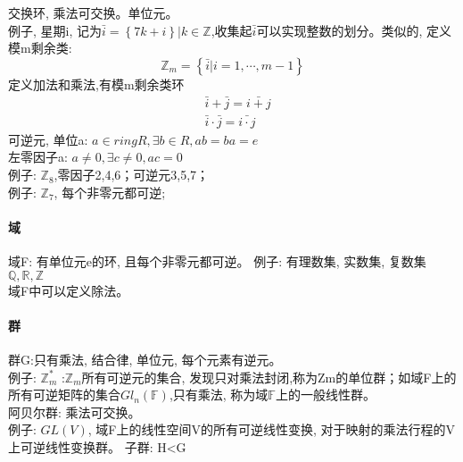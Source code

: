 \documentclass[UTF8]{../../09-Mathematics}
\begin{document}
交换环, 乘法可交换。单位元。\\
例子, 星期i, 记为$\bar i =\left\{ 7k+i \right\} |k\in \mathbb Z$,收集起$\bar i$可以实现整数的划分。类似的, 定义模m剩余类: 
\begin{equation}
    \mathbb Z_m =\left\{ \bar i | i=1, \cdots ,m-1 \right\}
\end{equation}
定义加法和乘法,有模m剩余类环
\begin{equation}
\begin{split}
&\bar i + \bar j =\bar{i+j}\\
& \bar i \cdot \bar j = \bar{i \cdot j}
\end{split}
\end{equation}
可逆元, 单位a: $a \in  ring R, \exists b \in R, ab=ba=e$\\
左零因子a: $a \neq 0, \exists c \neq 0,ac=0$\\
例子: $\mathbb Z_8$,零因子2,4,6；可逆元3,5,7；\\
例子: $\mathbb Z_7$, 每个非零元都可逆;\\



\paragraph{域}


域F: 有单位元e的环, 且每个非零元都可逆。
例子: 有理数集, 实数集, 复数集$\mathbb {Q,R,Z}$\\
域F中可以定义除法。



\paragraph{群}

群G:只有乘法, 结合律, 单位元, 每个元素有逆元。\\
例子: $\mathbb Z_m^*$ :$\mathbb Z_m$所有可逆元的集合, 发现只对乘法封闭,称为Zm的单位群；如域F上的所有可逆矩阵的集合$Gl_n(\mathbb F)$,只有乘法, 称为域$\mathbb F$上的一般线性群。\\
阿贝尔群: 乘法可交换。\\
例子: $GL(V)$, 域F上的线性空间V的所有可逆线性变换, 对于映射的乘法行程的V上可逆线性变换群。
子群: H<G\\
\end{document}
